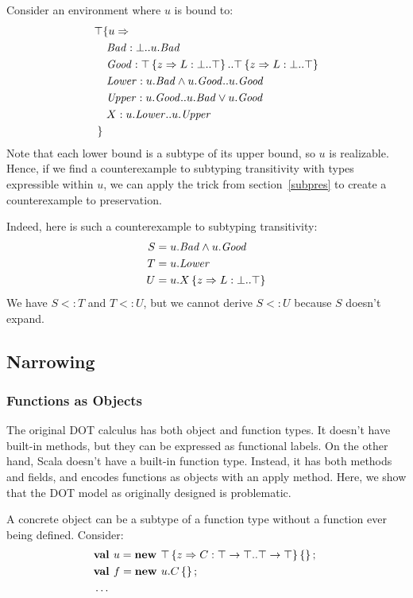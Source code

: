 \documentclass[preprint]{sigplanconf}
\begin{document}
Consider an environment where $u$ is bound to:
\begin{align*}
\top & \{u \Rightarrow \\
&\ \mathit{Bad} : \bot..u.\mathit{Bad}\\
&\ \mathit{Good} : \top \left\{z \Rightarrow L : \bot..\top \right\}..\top \left\{z \Rightarrow L : \bot..\top \right\}\\
&\ \mathit{Lower} : u.\mathit{Bad} \wedge u.\mathit{Good}..u.\mathit{Good}\\
&\ \mathit{Upper} : u.\mathit{Good}..u.\mathit{Bad} \vee u.\mathit{Good}\\
&\ X : u.\mathit{Lower}..u.\mathit{Upper}\\
 \}&
\end{align*}
Note that each lower bound is a subtype of its upper bound, so $u$ is
realizable. Hence, if we find a counterexample to subtyping
transitivity with types expressible within $u$, we can apply the trick
from section~\ref{subpres} to create a counterexample to preservation.

Indeed, here is such a counterexample to subtyping transitivity:
\begin{align*}
S &= u.\mathit{Bad} \wedge u.\mathit{Good}\\
T &= u.\mathit{Lower}\\
U &= u.X \left\{z \Rightarrow L : \bot..\top \right\}
\end{align*}
We have $S <: T$ and $T <: U$, but we cannot derive $S <: U$ because
$S$ doesn't expand.

\subsection{Narrowing}\label{narrowing}

\subsubsection{Functions as Objects}\label{fun}

The original DOT calculus has both object and function types. It
doesn't have built-in methods, but they can be expressed as functional
labels. On the other hand, Scala doesn't have a built-in function
type. Instead, it has both methods and fields, and encodes functions
as objects with an apply method. Here, we show that the DOT model as
originally designed is problematic.

A concrete object can be a subtype of a function type without a
function ever being defined. Consider:
\begin{align*}
&\mlnew u {\Top \refine z {\Ldecl C {\Top \tfun \Top} {\Top \tfun \Top}} \ldefs{}} {
\mlnew f {u.C \ldefs{}} {
\ldots
}}
\end{align*}
\end{document}
